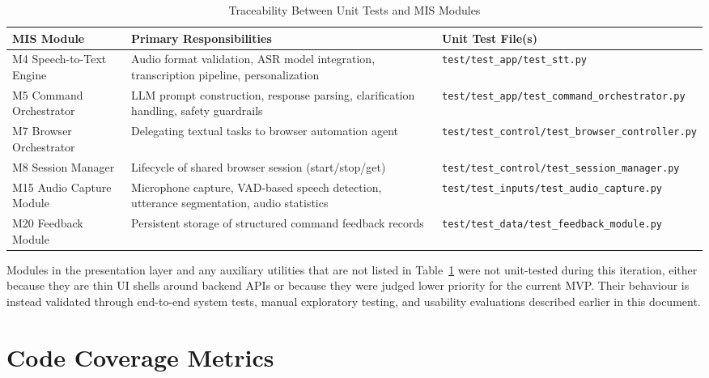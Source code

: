 \documentclass[12pt, titlepage]{article}
\begin{document}
\begin{table}[H]
\centering
\caption{Traceability Between Unit Tests and MIS Modules}
\label{tab:unit-trace-modules}
\renewcommand{\arraystretch}{1.2}
\begin{tabular}{|p{2.5cm}|p{5.5cm}|p{6cm}|}
\hline
\textbf{MIS Module} & \textbf{Primary Responsibilities} & \textbf{Unit Test File(s)} \\
\hline
M4 Speech-to-Text Engine & Audio format validation, ASR model integration, transcription pipeline, personalization & \texttt{test/test\_app/}\newline\texttt{test\_stt.py} \\
\hline
M5 Command Orchestrator & LLM prompt construction, response parsing, clarification handling, safety guardrails & \texttt{test/test\_app/}\newline\texttt{test\_command\_orchestrator.py} \\
\hline
M7 Browser Orchestrator & Delegating textual tasks to browser automation agent & \texttt{test/test\_control/}\newline\texttt{test\_browser\_controller.py} \\
\hline
M8 Session Manager & Lifecycle of shared browser session (start/stop/get) & \texttt{test/test\_control/}\newline\texttt{test\_session\_manager.py} \\
\hline
M15 Audio Capture Module & Microphone capture, VAD-based speech detection, utterance segmentation, audio statistics & \texttt{test/test\_inputs/}\newline\texttt{test\_audio\_capture.py} \\
\hline
M20 Feedback Module & Persistent storage of structured command feedback records & \texttt{test/test\_data/}\newline\texttt{test\_feedback\_module.py} \\
\hline
\end{tabular}
\end{table}

Modules in the presentation layer and any auxiliary utilities that are not listed in Table~\ref{tab:unit-trace-modules} were not unit-tested during this iteration, either because they are thin UI shells around backend APIs or because they were judged lower priority for the current MVP. Their behaviour is instead validated through end-to-end system tests, manual exploratory testing, and usability evaluations described earlier in this document.

\section{Code Coverage Metrics}
\end{document}
